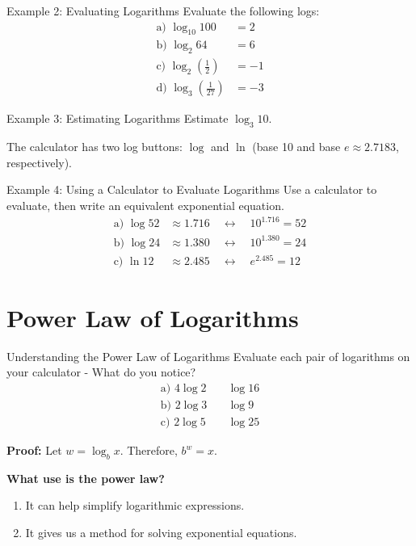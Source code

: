 \documentclass{article}
\begin{document}
\begin{examplebox}{Example 2: Evaluating Logarithms}
Evaluate the following logs:
\begin{align*}
    \text{a) } \log_{10}{100} &= 2\\
    \text{b) } \log_2{64} &= 6\\
    \text{c) } \log_2{\left(\frac{1}{2}\right)} &= -1\\
    \text{d) } \log_3{\left(\frac{1}{27}\right)} &= -3
\end{align*}
\end{examplebox}

\begin{examplebox}{Example 3: Estimating Logarithms}
Estimate \(\log_3{10}\).

The calculator has two log buttons: \(\log\) and \(\ln\) (base 10 and base \(e \approx 2.7183\), respectively).
\end{examplebox}

\begin{examplebox}{Example 4: Using a Calculator to Evaluate Logarithms}
Use a calculator to evaluate, then write an equivalent exponential equation.
\begin{align*}
    \text{a) } \log{52} &\approx 1.716 \quad \leftrightarrow \quad 10^{1.716} = 52\\
    \text{b) } \log{24} &\approx 1.380 \quad \leftrightarrow \quad 10^{1.380} = 24\\
    \text{c) } \ln{12} &\approx 2.485 \quad \leftrightarrow \quad e^{2.485} = 12
\end{align*}
\end{examplebox}

\section{Power Law of Logarithms}

\begin{lessonbox}{Understanding the Power Law of Logarithms}
Evaluate each pair of logarithms on your calculator - What do you notice?
\begin{align*}
    \text{a) } 4 \log{2} &\quad \log{16}\\
    \text{b) } 2 \log{3} &\quad \log{9}\\
    \text{c) } 2 \log{5} &\quad \log{25}
\end{align*}

\textbf{Proof:} Let \( w = \log_b{x} \). Therefore, \( b^w = x \).

\textbf{What use is the power law?}
\begin{enumerate}
    \item It can help simplify logarithmic expressions.
    \item It gives us a method for solving exponential equations.
\end{enumerate}
\end{lessonbox}
\end{document}
